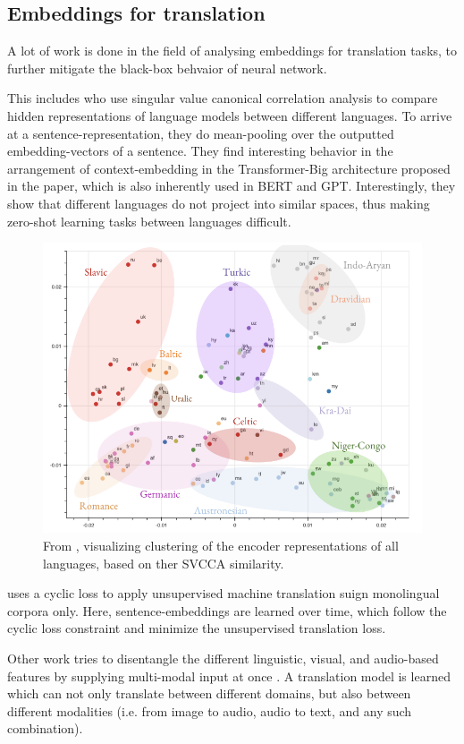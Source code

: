\documentclass[a4paper,12pt,oneside,openright]{report}
\begin{document}
\subsection{Embeddings for translation}

A lot of work is done in the field of analysing embeddings for translation tasks, to further mitigate the black-box behvaior of neural network.

This includes \cite{kudugunta18} who use singular value canonical correlation analysis to compare hidden representations of language models between different languages.
To arrive at a sentence-representation, they do mean-pooling over the outputted embedding-vectors of a sentence. 
They find interesting behavior in the arrangement of context-embedding in the Transformer-Big architecture proposed in the \cite{vaswani17} paper, which is also inherently used in BERT and GPT.
Interestingly, they show that different languages do not project into similar spaces, thus making zero-shot learning tasks between languages difficult.


\begin{figure}[h]
	\center
  \includegraphics[width=0.6\linewidth]{./assets/relatedwork/embeddings_by_language.png}
  \caption{From \cite{kudugunta18}, visualizing clustering of the encoder representations of all languages, based on ther SVCCA similarity.}
  \label{fig:embeddings_by_language}
\end{figure}


\cite{lample18} uses a cyclic loss to apply unsupervised machine translation suign monolingual corpora only. 
Here, sentence-embeddings are learned over time, which follow the cyclic loss constraint and minimize the unsupervised translation loss.

Other work tries to disentangle the different linguistic, visual, and audio-based features by supplying multi-modal input at once \cite{ma19}.
A translation model is learned which can not only translate between different domains, but also between different modalities (i.e. from image to audio, audio to text, and any such combination).
\end{document}
